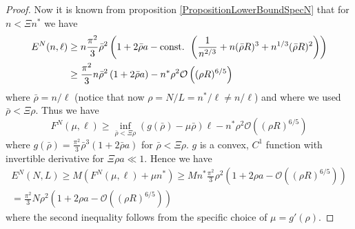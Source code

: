 \documentclass[a4paper,11pt]{article}
\numberwithin{equation}{section}
\begin{document}
\begin{proof}
			Now it is known from proposition \ref{PropositionLowerBoundSpecN} that for $ n<\Xi n^* $ we have \begin{equation}
			\begin{aligned}
			E^{N}(n,\ell)&\geq n\frac{\pi^2}{3}\bar{\rho}^2\left(1+2\bar{\rho} a-\textnormal{const. }\left(\frac{1}{n^{2/3}}+n(\bar{\rho} R)^3+n^{1/3}(\bar{\rho} R)^2\right)\right)\\
			&\geq \frac{\pi^2}{3}n\bar{\rho}^2\left(1+2\bar{\rho}a\right)-n^*\rho^2\mathcal{O}\left((\rho R)^{6/5}\right)
			\end{aligned}
			\end{equation}
			where $ \bar{\rho}=n/\ell $ (notice that now $ \rho=N/L=n^\ast/\ell\neq n/\ell $) and where we used $ \bar{\rho}<\Xi\rho$.
			Thus we have \begin{equation}
			F^{N}(\mu,\ell)\geq \inf_{\bar{\rho}<\Xi\rho}(g(\bar{\rho})-\mu\bar{\rho})\ell-n^\ast \rho^2 \mathcal{O}\left((\rho R)^{6/5}\right)
			\end{equation}
			where $
			g(\bar{\rho})=
			\frac{\pi^2}{3}\bar{\rho}^3\left(1+2\bar{\rho}a\right)
			$ for $ \bar{\rho}<\Xi\rho $. $ g $ is a convex, $ C^{1} $ function with invertible derivative for $ \Xi\rho a\ll 1  $. Hence we have \begin{equation}
			\begin{aligned}
			E^{N}(N,L)\geq M(F^{N}(\mu,\ell)+\mu n^*)\geq Mn^\ast\frac{\pi^2}{3} \rho^2 \left(1+2\rho a-\mathcal{O}\left((\rho R)^{6/5}\right)\right)\\
			=\frac{\pi^2}{3} N\rho^2 \left(1+2\rho a-\mathcal{O}\left((\rho R)^{6/5}\right)\right)
			\end{aligned}
			\end{equation}
			where the second inequality follows from the specific choice of $ \mu=g'(\rho) $.
		\end{proof}
	 
	
	
	
\end{document}
